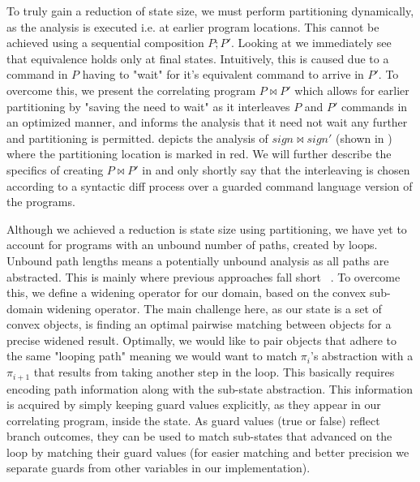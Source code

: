To truly gain a reduction of state size, we must perform partitioning dynamically, as the analysis is executed i.e. at earlier program locations. This cannot be achieved using a sequential composition $P;P'$. Looking at  we immediately see that equivalence holds only at final states. Intuitively, this is caused due to a command in $P$ having to "wait" for it's equivalent command to arrive in $P'$. To overcome this, we present the correlating program $P \bowtie P'$ which allows for earlier partitioning by "saving the need to wait" as it interleaves $P$ and $P'$ commands in an optimized manner, and informs the analysis that it need not wait any further and partitioning is permitted.  depicts the analysis of $sign \bowtie sign'$ (shown in ) where the partitioning location is marked in red. We will further describe the specifics of creating $P \bowtie P'$ in  and only shortly say that the interleaving is chosen according to a syntactic diff process over a guarded command language version of the programs.



Although we achieved a reduction is state size using partitioning, we have yet to account for programs with an unbound number of paths, created by loops. Unbound path lengths means a potentially unbound analysis as all paths are abstracted. This is mainly where previous approaches fall short ~\cite{}. To overcome this, we define a widening operator for our domain, based on the convex sub-domain widening operator. The main challenge here, as our state is a set of convex objects, is finding an optimal pairwise matching between objects for a precise widened result. Optimally, we would like to pair objects that adhere to the same "looping path" meaning we would want to match $\pi_i$'s abstraction with a $\pi_{i+1}$ that results from taking another step in the loop. This basically requires encoding path information along with the sub-state abstraction. This information is acquired by simply keeping guard values explicitly, as they appear in our correlating program, inside the state. As guard values (true or false) reflect branch outcomes, they can be used to match sub-states that advanced on the loop by matching their guard values (for easier matching and better precision we separate guards from other variables in our implementation). 



